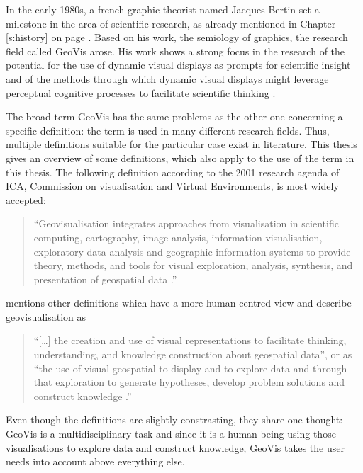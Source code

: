 In the early 1980s, a french graphic theorist named Jacques Bertin set a milestone in the area of scientific research, as already mentioned in Chapter \ref{s:history} on page \pageref{crossref:bertain}. Based on his work, the semiology of graphics, the research field called \ac{GeoVis} arose. His work shows a strong focus in the research of the potential for the use of dynamic visual displays as prompts for scientific insight and of the methods through which dynamic visual displays might leverage perceptual cognitive processes to facilitate scientific thinking .

The broad term \ac{GeoVis} has the same problems as the other one concerning a specific definition: the term is used in many different research fields. Thus, multiple definitions suitable for the particular case exist in literature. This thesis gives an overview of some definitions, which also apply to the use of the term in this thesis.
The following definition according to the 2001 research agenda of \ac{ICA}, Commission on visualisation and Virtual Environments, is most widely accepted:
\begin{quote}
``Geovisualisation integrates approaches from visualisation in scientific computing, cartography, image analysis, information visualisation, exploratory data analysis and geographic information systems to provide theory, methods, and tools for visual exploration, analysis, synthesis, and presentation of geospatial data .''
\end{quote}

\citeauthor{Noellenburg2007} mentions other definitions which have a more human-centred view and describe geovisualisation as
\begin{quote}
``[\ldots] the creation and use of visual representations to facilitate thinking, understanding, and knowledge construction about geospatial data'', or as ``the use of visual geospatial to display and to explore data and through that exploration to generate hypotheses, develop problem solutions and construct knowledge .''
\end{quote}

Even though the definitions are slightly constrasting, they share one thought: \ac{GeoVis} is a multidisciplinary task and since it is a human being using those visualisations to explore data and construct knowledge, \ac{GeoVis} takes the user needs into account above everything else.

\cbend